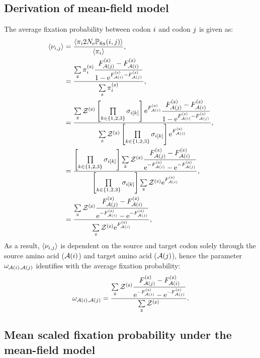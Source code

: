 \subsection{Derivation of mean-field model}
\label{subsec:mean-field-derivation}
The average fixation probability between codon ${i}$ and codon ${j}$ is given as:
\begin{align}
    \left\langle \nu_{{i}, {j}} \right\rangle & = \dfrac{ \left\langle \pi_{{i}} 2N_{\text{e}} \mathbb{P}_{\text{fix}}({i}, {j}) \right\rangle }{ \left\langle \pi_{{i}} \right\rangle }, \\
    & = \dfrac{ \sum\limits_{\text{z}} \pi_{{i}}^{(\text{z})} \dfrac{F_{\mathcal{A}({j})}^{(\text{z})} - F_{\mathcal{A}({i})}^{(\text{z})}}{1 - \text{e}^{F_{\mathcal{A}({i})}^{(\text{z})} - F_{\mathcal{A}({j})}^{(\text{z})}}} }{ \sum\limits_{\text{z}} \pi_{{i}}^{(\text{z})} }, \\
    & = \dfrac{ \sum\limits_{\text{z}} \mathcal{Z}^{(\text{z})} \left[\prod\limits_{k \in \{ 1, 2, 3 \}} \sigma_{{i}[k]}\right] \text{e}^{F_{\mathcal{A}({i})}^{(\text{z})}} \dfrac{F_{\mathcal{A}({j})}^{(\text{z})} - F_{\mathcal{A}({i})}^{(\text{z})}}{1 - \text{e}^{F_{\mathcal{A}({i})}^{(\text{z})} - F_{\mathcal{A}({j})}^{(\text{z})}}} }{ \sum\limits_{\text{z}} \mathcal{Z}^{(\text{z})} \left[\prod\limits_{k \in \{ 1, 2, 3 \}} \sigma_{{i}[k]}\right] \text{e}^{F_{\mathcal{A}({i})}^{(\text{z})}} }, \\
    & = \dfrac{ \left[\prod\limits_{k \in \{ 1, 2, 3 \}} \sigma_{{i}[k]}\right] \sum\limits_{\text{z}} \mathcal{Z}^{(\text{z})}  \dfrac{F_{\mathcal{A}({j})}^{(\text{z})} - F_{\mathcal{A}({i})}^{(\text{z})}}{ \text{e}^{-F_{\mathcal{A}({i})}^{(\text{z})}} - \text{e}^{ - F_{\mathcal{A}({j})}^{(\text{z})}}} }{ \left[\prod\limits_{k \in \{ 1, 2, 3 \}} \sigma_{{i}[k]}\right] \sum\limits_{\text{z}} \mathcal{Z}^{(\text{z})} \text{e}^{F_{\mathcal{A}({i})}^{(\text{z})}} }, \\
    & = \dfrac{ \sum\limits_{\text{z}} \mathcal{Z}^{(\text{z})}  \dfrac{F_{\mathcal{A}({j})}^{(\text{z})} - F_{\mathcal{A}({i})}^{(\text{z})}}{ \text{e}^{-F_{\mathcal{A}({i})}^{(\text{z})}} - \text{e}^{ - F_{\mathcal{A}({j})}^{(\text{z})}}} }{  \sum\limits_{\text{z}} \mathcal{Z}^{(\text{z})} \text{e}^{F_{\mathcal{A}({i})}^{(\text{z})}} },
\end{align}
As a result, $\left\langle \nu_{{i}, {j}} \right\rangle$ is dependent on the source and target codon solely through the source amino acid ($\mathcal{A}({i})$) and target amino acid ($\mathcal{A}({j})$), hence the parameter $\omega_{\mathcal{A}({i}), \mathcal{A}({j})}$ identifies with the average fixation probability:
\begin{equation}
    \omega_{\mathcal{A}({i}), \mathcal{A}({j})} = \dfrac{ \sum\limits_{\text{z}} \mathcal{Z}^{(\text{z})}  \dfrac{F_{\mathcal{A}({j})}^{(\text{z})} - F_{\mathcal{A}({i})}^{(\text{z})}}{ \text{e}^{-F_{\mathcal{A}({i})}^{(\text{z})}} - \text{e}^{ - F_{\mathcal{A}({j})}^{(\text{z})}}} }{  \sum\limits_{\text{z}} \mathcal{Z}^{(\text{z})}  }.
\end{equation}

\subsection{Mean scaled fixation probability under the mean-field model}
\label{sec:mut-bias-mean-field-omega}

